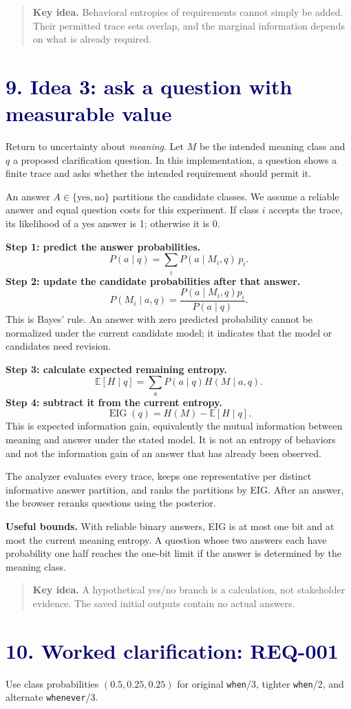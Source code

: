\documentclass[11pt,a4paper]{article}
\newcommand{\lesson}[2]{\section*{\textcolor{navy}{#1. #2}}}
\newcommand{\key}[1]{\begin{quote}\color{teal}\textbf{Key idea.} #1\end{quote}}
\begin{document}
\key{Behavioral entropies of requirements cannot simply be added. Their permitted trace sets overlap, and the marginal information depends on what is already required.}
\newpage

\lesson{9}{Idea 3: ask a question with measurable value}
Return to uncertainty about \emph{meaning}. Let \(M\) be the intended meaning class and \(q\) a proposed clarification question. In this implementation, a question shows a finite trace and asks whether the intended requirement should permit it.

An answer \(A\in\{\mathrm{yes},\mathrm{no}\}\) partitions the candidate classes. We assume a reliable answer and equal question costs for this experiment. If class \(i\) accepts the trace, its likelihood of a yes answer is 1; otherwise it is 0.

\textbf{Step 1: predict the answer probabilities.}
\[
P(a\mid q)=\sum_i P(a\mid M_i,q)\,p_i.
\]
\textbf{Step 2: update the candidate probabilities after that answer.}
\[
P(M_i\mid a,q)=\frac{P(a\mid M_i,q)p_i}{P(a\mid q)}.
\]
This is Bayes' rule. An answer with zero predicted probability cannot be normalized under the current candidate model; it indicates that the model or candidates need revision.

\textbf{Step 3: calculate expected remaining entropy.}
\[
\mathbb{E}[H\mid q]=\sum_a P(a\mid q)H(M\mid a,q).
\]
\textbf{Step 4: subtract it from the current entropy.}
\[
\boxed{\operatorname{EIG}(q)=H(M)-\mathbb{E}[H\mid q].}
\]
This is expected information gain, equivalently the mutual information between meaning and answer under the stated model. It is not an entropy of behaviors and not the information gain of an answer that has already been observed.

The analyzer evaluates every trace, keeps one representative per distinct informative answer partition, and ranks the partitions by EIG. After an answer, the browser reranks questions using the posterior.

\textbf{Useful bounds.} With reliable binary answers, EIG is at most one bit and at most the current meaning entropy. A question whose two answers each have probability one half reaches the one-bit limit if the answer is determined by the meaning class.

\key{A hypothetical yes/no branch is a calculation, not stakeholder evidence. The saved initial outputs contain no actual answers.}
\newpage

\lesson{10}{Worked clarification: REQ-001}
Use class probabilities \((0.5,0.25,0.25)\) for original \texttt{when}/3, tighter \texttt{when}/2, and alternate \texttt{whenever}/3.
\end{document}
